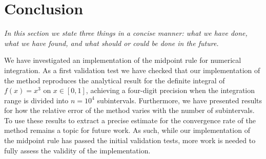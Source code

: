 \documentclass[english,notitlepage,reprint,nofootinbib]{revtex4-1}  %
\begin{document}
\section{Conclusion}\label{sec:conclusion}
\textit{In this section we state three things in a concise manner: what we have done, what we have found, and what should or could be done in the future.}

We have investigated an implementation of the midpoint rule for numerical integration. As a first validation test we have checked that our implementation of the method reproduces the analytical result for the definite integral of $f(x) = x^3$ on $x \in [0,1]$, achieving a four-digit precision when the integration range is divided into $n=10^4$ subintervals. Furthermore, we have presented results for how the relative error of the method varies with the number of subintervals. To use these results to extract a precise estimate for the convergence rate of the method remains a topic for future work. As such, while our implementation of the midpoint rule has passed the initial validation tests, more work is needed to fully assess the validity of the implementation.

\onecolumngrid

%

\end{document}
